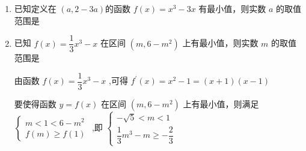 \begin{enumerate}
\begin{enumerate}
\begin{jieda}
            当 $0 < x < 1$ 时 ${f}^{\prime }\left( x\right)  < 0$ ,当 $x > 1$ 时 ${f}^{\prime }\left( x\right)  > 0$ ,
            
            所以 $f\left( x\right)$ 在 $\left( {0,1}\right)$ 上单调递减,在 $\left( {1, + \infty }\right)$ 上单调递增,所以 $f\left( x\right)$ 在 $x = 1$ 处取得极小值,即最小值，又因为函数 $f\left( x\right)$ 在 $\left( {a,2 - {3a}}\right)$ 内有最小值，故 $0 \leq  a < 1 < 2 - {3a}$ ，解得 $0 \leq  a < \dfrac{1}{3}$
        \end{jieda}

        \item 已知定义在 $\left( {a,2 - {3a}}\right)$的函数 $f\left( x\right)  = x^3 - 3x$ 有最小值，则实数 $a$ 的取值范围是\blkda{$\left[-2,\dfrac{1}{3}\right)$}
        
        \item 已知 $f\left( x\right)  = \dfrac{1}{3}{x}^{3} - x$ 在区间 $\left( {m,6 - {m}^{2}}\right)$ 上有最小值，则实数 $m$ 的取值范围是
        \begin{jieda}
            由函数 $f\left( x\right)  = \dfrac{1}{3}{x}^{3} - x$ ,可得 ${f}^{\prime }\left( x\right)  = {x}^{2} - 1 = \left( {x + 1}\right) \left( {x - 1}\right)$

            
            要使得函数 $y = f\left( x\right)$ 在区间 $\left( {m,6 - {m}^{2}}\right)$ 上有最小值，则满足 $\left\{  \begin{matrix} m < 1 < 6 - {m}^{2} \\  f\left( m\right)  \geq  f\left( 1\right)  \end{matrix}\right.$ ,即 $\left\{  \begin{array}{l}  - \sqrt{5} < m < 1 \\  \dfrac{1}{3}{m}^{3} - m \geq   - \dfrac{2}{3} \end{array}\right.$
            

\end{jieda}
\end{enumerate}
\end{enumerate}
